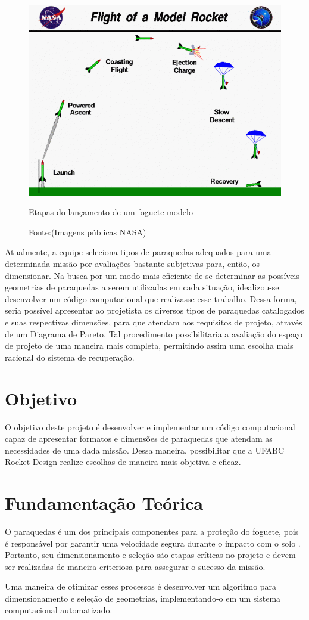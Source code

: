 \documentclass[a4paper, 12pt]{article}[abntex2]
\begin{document}
{            \\
            \begin{figure}[h!]
                \centering
                \includegraphics[width = 0.5\linewidth]{figuras/flight.png}
                \caption{Etapas do lançamento de um foguete modelo}
                \caption*{Fonte:(Imagens públicas NASA)}
                \label{fig: etapas do lançamento}
            \end{figure}
            \par Atualmente, a equipe seleciona tipos de paraquedas adequados para uma determinada missão por avaliações bastante subjetivas para, então, os dimensionar. Na busca por um modo mais eficiente de se determinar as possíveis geometrias de paraquedas a serem utilizadas em cada situação, idealizou-se desenvolver um código computacional que realizasse esse trabalho. Dessa forma, seria possível apresentar ao projetista os diversos tipos de paraquedas catalogados e suas respectivas dimensões, para que atendam aos requisitos de projeto, através de um Diagrama de Pareto. Tal procedimento possibilitaria a avaliação do espaço de projeto de uma maneira mais completa, permitindo assim uma escolha mais racional do sistema de recuperação.
        \section{Objetivo}
            O objetivo deste projeto é desenvolver e implementar um código computacional capaz de apresentar formatos e dimensões de paraquedas que atendam as necessidades de uma dada missão. Dessa maneira, possibilitar que a UFABC Rocket Design realize escolhas de maneira mais objetiva e eficaz.
        \section{Fundamentação Teórica}
        O paraquedas é um dos principais componentes para a proteção do foguete, pois é responsável por garantir uma velocidade segura durante o impacto com o solo \cite{miranda21}. Portanto, seu dimensionamento e seleção são etapas críticas no projeto e devem ser realizadas de maneira criteriosa \cite{knacke92} para assegurar o sucesso da missão.
        \par Uma maneira de otimizar esses processos é desenvolver um algoritmo para dimensionamento e seleção de geometrias, implementando-o em um sistema computacional automatizado.
}
\end{document}
